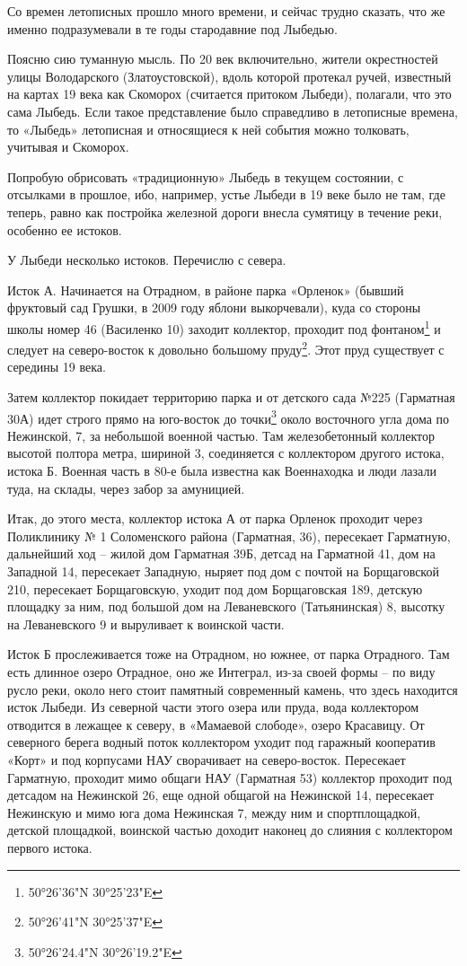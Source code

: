 Со времен летописных прошло много времени, и сейчас трудно сказать, что же именно подразумевали в те годы стародавние под Лыбедью. 

Поясню сию туманную мысль. По 20 век включительно, жители окрестностей улицы Володарского (Златоустовской), вдоль которой протекал ручей, известный на картах 19 века как Скоморох (считается притоком Лыбеди), полагали, что это сама Лыбедь. Если такое представление было справедливо в летописные времена, то «Лыбедь» летописная и относящиеся к ней события можно толковать, учитывая и Скоморох.

Попробую обрисовать «традиционную» Лыбедь в текущем состоянии, с отсылками в прошлое, ибо, например, устье Лыбеди в 19 веке было не там, где теперь, равно как постройка железной дороги внесла сумятицу в течение реки, особенно ее истоков.

У Лыбеди несколько истоков. Перечислю с севера.

Исток А. Начинается на Отрадном, в районе парка «Орленок» (бывший фруктовый сад Грушки, в 2009 году яблони выкорчевали), куда со стороны школы номер 46 (Василенко 10) заходит коллектор, проходит под фонтаном\footnote{50°26'36"N 30°25'23"E} и следует на северо-восток к довольно большому пруду\footnote{50°26'41"N 30°25'37"E}. Этот пруд существует с середины 19 века.  

Затем коллектор покидает территорию парка и от детского сада №225 (Гарматная 30А) идет строго прямо на юго-восток до точки\footnote{50°26'24.4"N 30°26'19.2"E} около восточного угла дома по Нежинской, 7, за небольшой военной частью. Там железобетонный коллектор высотой полтора метра, шириной 3, соединяется с коллектором другого истока, истока Б. Военная часть в 80-е была известна как Военнаходка и люди лазали туда, на склады, через забор за амуницией.

Итак, до этого места, коллектор истока А от парка Орленок проходит через Поликлинику № 1 Соломенского района (Гарматная, 36), пересекает Гарматную, дальнейший ход – жилой дом Гарматная 39Б, детсад на Гарматной 41, дом на Западной 14, пересекает Западную, ныряет под дом с почтой на Борщаговской 210, пересекает Борщаговскую, уходит под дом Борщаговская 189, детскую площадку за ним, под большой дом на Леваневского (Татьянинская) 8, высотку на Леваневского 9 и выруливает к воинской части. 

Исток Б прослеживается тоже на Отрадном, но южнее, от парка Отрадного. Там есть длинное озеро Отрадное, оно же Интеграл, из-за своей формы – по виду русло реки, около него стоит памятный современный камень, что здесь находится исток Лыбеди. Из северной части этого озера или пруда, вода коллектором отводится в лежащее к северу, в «Мамаевой слободе», озеро Красавицу. От северного берега водный поток коллектором уходит под гаражный кооператив «Корт» и под корпусами НАУ сворачивает на северо-восток. Пересекает Гарматную, проходит мимо общаги НАУ (Гарматная 53) коллектор проходит под детсадом на Нежинской 26, еще одной общагой на Нежинской 14, пересекает Нежинскую и мимо юга дома Нежинская 7, между ним и спортплощадкой, детской площадкой, воинской частью доходит наконец до слияния с коллектором первого истока.


